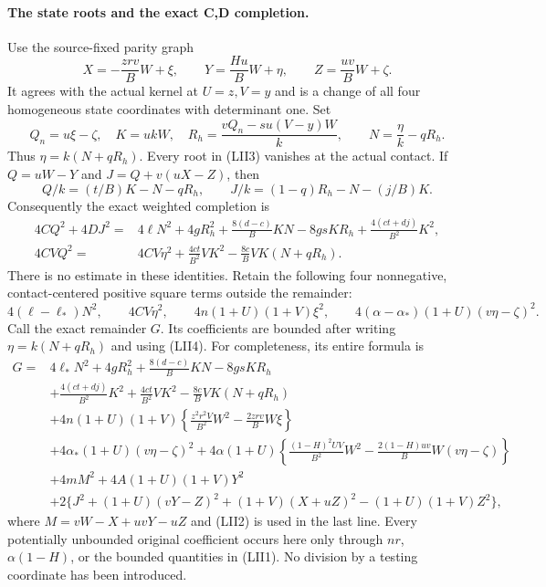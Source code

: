 \paragraph{The state roots and the exact C,D completion.}
Use the source-fixed parity graph
\[
 X=-\frac{zr v}{B}W+\xi,\qquad
 Y=\frac{Hu}{B}W+\eta,\qquad
 Z=\frac{uv}{B}W+\zeta.                         \tag{LII2}
\]
It agrees with the actual kernel at $U=z,V=y$ and is a change of all
four homogeneous state coordinates with determinant one.  Set
\[
 Q_n=u\xi-\zeta,\quad K=ukW,\quad
 R_h=\frac{vQ_n-su(V-y)W}{k},\qquad
 N=\frac\eta k-qR_h.                              \tag{LII3}
\]
Thus $\eta=k(N+qR_h)$.  Every root in (LII3) vanishes at the actual
contact.  If $Q=uW-Y$ and $J=Q+v(uX-Z)$, then
\[
 Q/k=(t/B)K-N-qR_h,\qquad
 J/k=(1-q)R_h-N-(j/B)K.
\]
Consequently the exact weighted completion is
\[
\begin{split}
 4CQ^2+4DJ^2={}&4\ell N^2+4gR_h^2
 +\frac{8(d-c)}BKN-8gsKR_h
 +\frac{4(ct+dj)}{B^2}K^2,\\
 4CVQ^2={}&4CV\eta^2
 +\frac{4ct}{B^2}VK^2-\frac{8c}BVK(N+qR_h).
                                                        \end{split}\tag{LII4}
\]
There is no estimate in these identities.  Retain the following
four nonnegative, contact-centered positive square terms outside the remainder:
\[
 4(\ell-\ell_*)N^2,\qquad 4CV\eta^2,\qquad
 4n(1+U)(1+V)\xi^2,\qquad
 4(\alpha-\alpha_*)(1+U)(v\eta-\zeta)^2.          \tag{LII5}
\]
Call the exact remainder $G$.  Its coefficients are bounded after
writing $\eta=k(N+qR_h)$ and using (LII4).  For completeness, its
entire formula is
\[
\begin{split}
G={}&4\ell_*N^2+4gR_h^2+\frac{8(d-c)}BKN-8gsKR_h\\
 &+\frac{4(ct+dj)}{B^2}K^2
 +\frac{4ct}{B^2}VK^2-\frac{8c}BVK(N+qR_h)\\
 &+4n(1+U)(1+V)
   \left\{\frac{z^2r^2V}{B^2}W^2-\frac{2zr v}B W\xi\right\}\\
 &+4\alpha_*(1+U)(v\eta-\zeta)^2
  +4\alpha(1+U)
   \left\{\frac{(1-H)^2UV}{B^2}W^2
        -\frac{2(1-H)uv}B W(v\eta-\zeta)\right\}\\
 &+4mM^2+4A(1+U)(1+V)Y^2\\
 &+2\{J^2+(1+U)(vY-Z)^2+(1+V)(X+uZ)^2
                      -(1+U)(1+V)Z^2\},        \end{split}\tag{LII6}
\]
where $M=vW-X+uvY-uZ$ and (LII2) is used in the last line.
Every potentially unbounded original coefficient occurs here only
through $nr$, $\alpha(1-H)$, or the bounded quantities in (LII1).
No division by a testing coordinate has been introduced.

